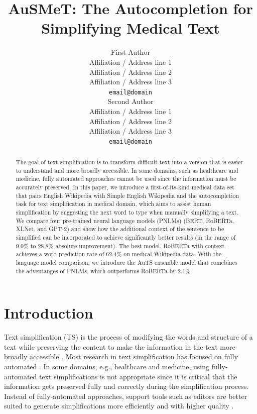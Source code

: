 \documentclass[11pt]{article}
\title{AuSMeT: The Autocompletion for Simplifying Medical Text}
\author{First Author \\
  Affiliation / Address line 1 \\
  Affiliation / Address line 2 \\
  Affiliation / Address line 3 \\
  {\tt email@domain} \\\And
  Second Author \\
  Affiliation / Address line 1 \\
  Affiliation / Address line 2 \\
  Affiliation / Address line 3 \\
  {\tt email@domain} \\}
\date{}
\begin{document}
\maketitle
\begin{abstract}
  The goal of text simplification is to transform difficult text into a version that is easier to understand and more broadly accessible.  In some domains, such as healthcare and medicine, fully automated approaches cannot be used since the information must be accurately preserved. In this paper, we introduce a first-of-its-kind medical data set that pairs English Wikipedia with Simple English Wikipedia and the autocompletion task for text simplification in medical domain, which aims to assist human simplification by suggesting the next word to type when manually simplifying a text. We compare four pre-trained neural language models (PNLMs) (BERT, RoBERTa, XLNet, and GPT-2) and show how the additional context of the sentence to be simplified can be incorporated to achieve significantly better results (in the range of 9.0\% to 28.8\% absolute improvement). The best model, RoBERTa with context, achieves a word prediction rate of 62.4\% on medical Wikipedia data. With the language model comparison, we introduce the AuTS ensemble model that comebines the adventanges of PNLMs, which outperforms RoBERTa by 2.1\%.

\end{abstract}

\section{Introduction}

Text simplification (TS) is the process of modifying the words and structure of a text while preserving the content to make the information in the text more broadly accessible \cite{shardlow2014survey}. Most research in text simplification has focused on fully automated \cite{zhu10,coster2011learning,xu2016optimizing,zhang2017sentence,nishihara2019controllable}. In some domains, e.g., healthcare and medicine, using fully-automated text simplifications is not appropriate since it is critical that the information gets preserved fully and correctly during the simplification process. Instead of fully-automated approaches, support tools such as editors are better suited to generate simplifications more efficiently and with higher quality \cite{kloehn2018jmir}.
\end{document}
